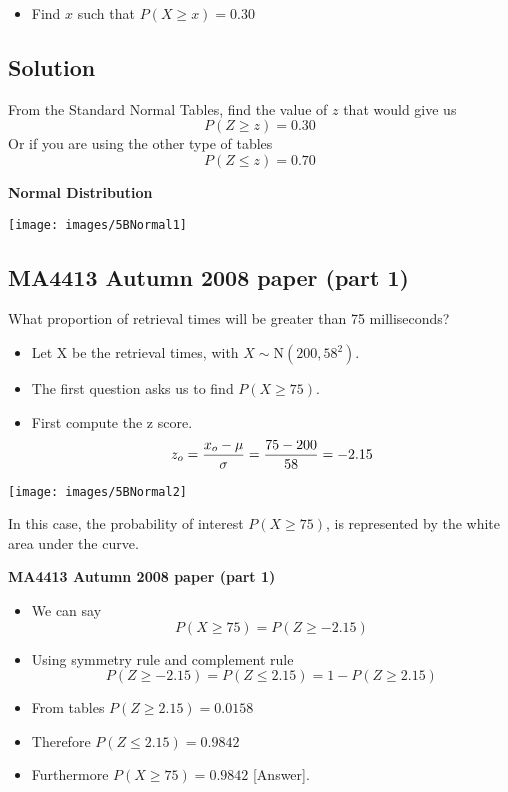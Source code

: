 \documentclass[]{report}
\begin{document}
\begin{itemize}
	\item Find $x$ such that $P(X \geq x) = 0.30$
\end{itemize}



\subsection*{Solution}

From the Standard Normal Tables, find the value of $z$ that would give us
\[ P(Z \geq z) = 0.30 \]
Or if you are using the other type of tables 
\[ P(Z \leq z) = 0.70  \]


\noindent \textbf{Normal Distribution}

\begin{center}
	\texttt{[image: images/5BNormal1]}
\end{center}




\subsection{MA4413 Autumn 2008 paper (part 1)}
What proportion of retrieval times will be greater than 75 milliseconds?\\ \bigskip

\begin{itemize}
	\item Let X be the retrieval times, with $X \sim \mbox{N}(200,58^2)$.\\
	\item The first question asks us to find $P( X \geq 75)$. \\
	\item First compute the z score.
	\[ z_o =  {x_o - \mu \over \sigma} = {75 - 200 \over 58}  = -2.15 \]
\end{itemize}



\begin{center}
	\texttt{[image: images/5BNormal2]}
\end{center}

In this case, the probability of interest $P(X\geq 75)$, is represented by the white area under the curve.


{
	\noindent \textbf{MA4413 Autumn 2008 paper (part 1)}
	\begin{itemize}
		\item We can say
		\[ P( X \geq 75) = P( Z \geq -2.15)\]
		\item Using symmetry rule and complement rule
		\[ P( Z \geq -2.15) = P( Z \leq 2.15) = 1- P( Z \geq 2.15)\]
		\item From tables $P( Z \geq 2.15) = 0.0158$
		\item Therefore $P( Z \leq 2.15) = 0.9842$
		\item Furthermore $P( X \geq 75) = \boldsymbol{0.9842}$ [Answer].
	\end{itemize}
}
\end{document}
